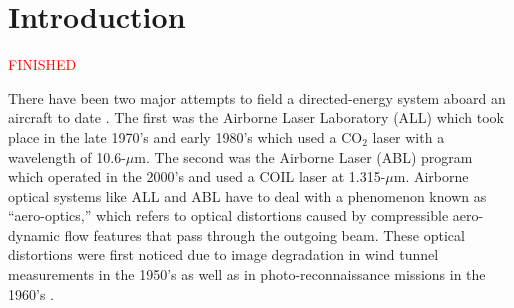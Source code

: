 
\chapter{Introduction}
\label{chap:01_intro}
\textcolor{red}{FINISHED}

There have been two major attempts to field a directed-energy system aboard an aircraft to date \cite{Jumper-2013-8KtN3pue}.
The first was the Airborne Laser Laboratory (ALL) which took place in the late 1970's and early 1980's which used a CO$_2$ laser with a wavelength of 10.6-$\mu$m.
The second was the Airborne Laser (ABL) program which operated in the 2000's and used a COIL laser at 1.315-$\mu$m.
Airborne optical systems like ALL and ABL have to deal with a phenomenon known as ``aero-optics,'' which refers to optical distortions caused by compressible aero-dynamic flow features that pass through the outgoing beam.
These optical distortions were first noticed due to image degradation in wind tunnel measurements in the 1950's \cite{Stine-1956-UaRzVZCe} as well as in photo-reconnaissance missions in the 1960's \cite{Kyrazis-2013-vwKeEBym}.

